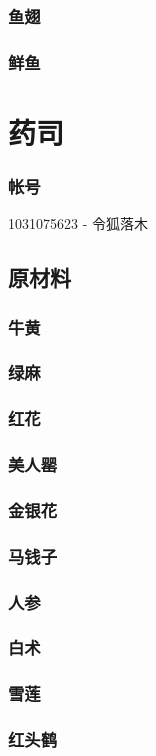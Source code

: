 \documentclass[12pt,a4paper,landscape]{article}
\begin{document}
\begin{CJK}{UTF8}{gbsn}
\subsubsection{鱼翅}
\subsubsection{鲜鱼}



\section{药司}
\subsubsection{帐号}
1031075623 - 令狐落木
\subsection{原材料}
\subsubsection{牛黄}
\subsubsection{绿麻}
\subsubsection{红花}
\subsubsection{美人罂}
\subsubsection{金银花}
\subsubsection{马钱子}
\subsubsection{人参}
\subsubsection{白术}
\subsubsection{雪莲}
\subsubsection{红头鹤}


\end{CJK}
\end{document}
